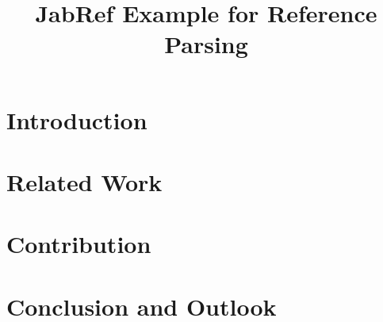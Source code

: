\documentclass[conference,a4paper,english]{IEEEtran}[2015/08/26]
\begin{document}
\title{JabRef Example for Reference Parsing}
\author{%
}

\maketitle

\begin{abstract}
\lipsum[1]
\end{abstract}

\section{Introduction}
\lipsum[2]

\section{Related Work}
\lipsum[3]
\cite{Alver2007,Alver2007a,Kopp2012,Kopp2018,Koenig2023}

\section{Contribution}
\lipsum[4-7]

\section{Conclusion and Outlook}
\lipsum[4]

\atColsEnd{\vfil}



\end{document}
